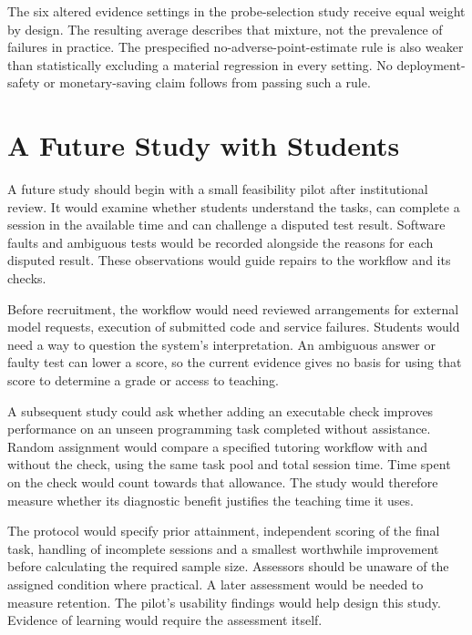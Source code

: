 The six altered evidence settings in the probe-selection study receive equal weight by design. The resulting average describes that mixture, not the prevalence
of failures in practice. The prespecified no-adverse-point-estimate rule is also weaker than statistically excluding a material
regression in every setting. No deployment-safety or monetary-saving claim follows from passing such a rule.

\section{A Future Study with Students}

A future study should begin with a small feasibility pilot after institutional review. It would examine whether students
understand the tasks, can complete a session in the available time and can challenge a disputed test result. Software faults
and ambiguous tests would be recorded alongside the reasons for each disputed result. These observations would guide repairs
to the workflow and its checks.

Before recruitment, the workflow would need reviewed arrangements for external model requests, execution of submitted code
and service failures. Students would need a way to question the system's interpretation. An ambiguous answer or faulty test
can lower a score, so the current evidence gives no basis for using that score to determine a grade or access to teaching.

A subsequent study could ask whether adding an executable check improves performance on an unseen programming task completed
without assistance. Random assignment would compare a specified tutoring workflow with and without the check, using the same
task pool and total session time. Time spent on the check would count towards that allowance. The study would therefore
measure whether its diagnostic benefit justifies the teaching time it uses.

The protocol would specify prior attainment, independent scoring of the final task, handling of incomplete sessions and a
smallest worthwhile improvement before calculating the required sample size. Assessors should be unaware of the assigned
condition where practical. A later assessment would be needed to measure retention. The pilot's usability findings would
help design this study. Evidence of learning would require the assessment itself.
